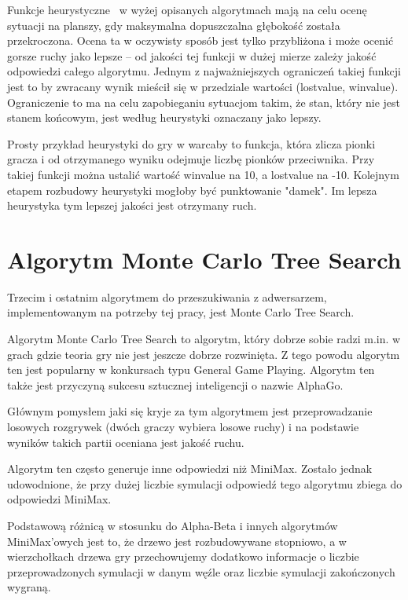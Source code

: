 \documentclass[polish,shortabstract,inz]{iithesis}
\begin{document}
Funkcje heurystyczne~\cite{wazniak} w wyżej opisanych algorytmach mają na celu ocenę sytuacji na planszy, gdy maksymalna dopuszczalna głębokość została przekroczona.
Ocena ta w oczywisty sposób jest tylko przybliżona i może ocenić gorsze ruchy jako lepsze -- od jakości tej funkcji w dużej mierze zależy jakość odpowiedzi całego algorytmu.
Jednym z najważniejszych ograniczeń takiej funkcji jest to by zwracany wynik mieścił się w przedziale wartości (lost\textunderscore value, win\textunderscore value).
Ograniczenie to ma na celu zapobieganiu sytuacjom takim, że stan, który nie jest stanem końcowym, jest według heurystyki oznaczany jako lepszy.

Prosty przykład heurystyki do gry w warcaby to funkcja, która zlicza pionki gracza i od otrzymanego wyniku odejmuje liczbę pionków przeciwnika.
Przy takiej funkcji można ustalić wartość win\textunderscore value na 10, a lost\textunderscore value na -10.
Kolejnym etapem rozbudowy heurystyki mogłoby być punktowanie "damek".
Im lepsza heurystyka tym lepszej jakości jest otrzymany ruch.

\section{Algorytm Monte Carlo Tree Search}
Trzecim i ostatnim algorytmem do przeszukiwania z adwersarzem, implementowanym na potrzeby tej pracy, jest Monte Carlo Tree Search.

Algorytm Monte Carlo Tree Search to algorytm, który dobrze sobie radzi m.in. w grach gdzie teoria gry nie jest jeszcze dobrze rozwinięta.
Z tego powodu algorytm ten jest popularny w konkursach typu General Game Playing.
Algorytm ten także jest przyczyną sukcesu sztucznej inteligencji o nazwie AlphaGo\cite{alphago}.

Głównym pomysłem jaki się kryje za tym algorytmem jest przeprowadzanie losowych rozgrywek (dwóch graczy wybiera losowe ruchy) i na podstawie wyników takich partii oceniana jest jakość ruchu.

Algorytm ten często generuje inne odpowiedzi niż MiniMax.
Zostało jednak udowodnione, że przy dużej liczbie symulacji odpowiedź tego algorytmu zbiega do odpowiedzi MiniMax.

Podstawową różnicą w stosunku do Alpha-Beta i innych algorytmów MiniMax'owych jest to, że drzewo jest rozbudowywane stopniowo, a w wierzchołkach drzewa gry przechowujemy dodatkowo informacje o liczbie przeprowadzonych symulacji w danym węźle oraz liczbie symulacji zakończonych wygraną.
\end{document}
